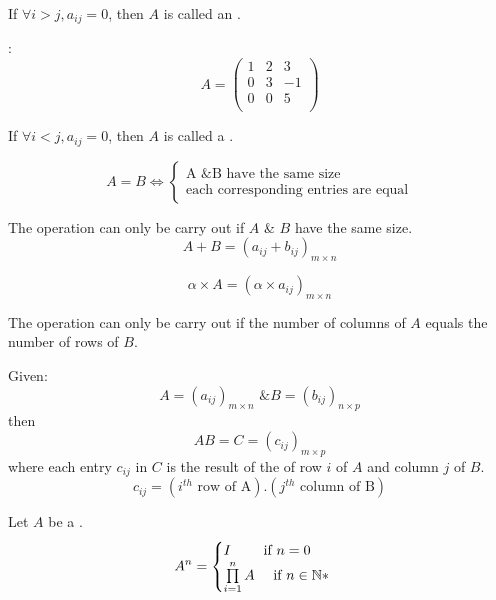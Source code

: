     \par If $\forall i > j, a_{ij} = 0$, then $A$ is called an .
    \par {}:
    \[
      A =
      \begin{pmatrix}
        1 & 2 &  3 \\
        0 & 3 & -1 \\
        0 & 0 &  5 \\
      \end{pmatrix}
    \]
    \par If $\forall i < j, a_{ij} = 0$, then $A$ is called a .



    \[
      A = B \iff
      \begin{cases}
        \mbox{A \& B have the same size} \\
        \mbox{each corresponding entries are equal}
      \end{cases}
    \]

    \par The operation can only be carry out if $A$ \& $B$ have the same
    size.
    \[
      A + B = (a_{ij} + b_{ij})_{m \times n}
    \]

    \[
      \alpha \times A = (\alpha \times a_{ij})_{m \times n}
    \]

    \par The operation can only be carry out if the number of columns of
    $A$ equals the number of rows of $B$.
    \par Given:
    \[
        A = (a_{ij})_{m \times n} \mbox{ \& }
        B = (b_{ij})_{n \times p}
    \]
    then
    \[
      AB = C = (c_{ij})_{m \times p}
    \]
    where each entry $c_{ij}$ in $C$ is the result of the  of
    row $i$ of $A$ and column $j$ of $B$.
    \[
      c_{ij} = (i^{th} \mbox{ row of A}) . (j^{th} \mbox{ column of B})
    \]

    \par Let $A$ be a .
    \[
      A^{n} =
      \begin{cases}
        I \qquad \mbox{ if } n = 0 \\
        \prod\limits _{i = 1}^{n} A \quad \mbox{ if } n \in \mathbb{N*}
      \end{cases}
    \]

